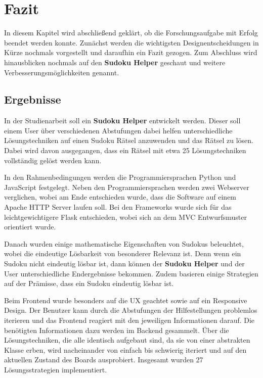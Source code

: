 
\chapter{Fazit}

In diesem Kapitel wird abschließend geklärt, ob die Forschungsaufgabe mit Erfolg beendet werden konnte. Zunächst werden die wichtigsten Designentscheidungen in Kürze nochmals vorgestellt und daraufhin ein Fazit gezogen. Zum Abschluss wird hinausblicken nochmals auf den \textbf{Sudoku Helper} geschaut und weitere Verbesserungsmöglichkeiten genannt. 

\section{Ergebnisse}

In der Studienarbeit soll ein \textbf{Sudoku Helper} entwickelt werden. Dieser soll einem User über verschiedenen Abstufungen dabei helfen unterschiedliche Lösungstechniken auf einen Sudoku Rätsel anzuwenden und das Rätsel zu lösen. Dabei wird davon ausgegangen, dass ein Rätsel mit etwa 25 Lösungstechniken vollständig gelöst werden kann. 

In den Rahmenbedingungen werden die Programmiersprachen Python und JavaScript festgelegt. Neben den Programmiersprachen werden zwei Webserver verglichen, wobei am Ende entschieden wurde, dass die Software auf einem Apache \ac{HTTP} Server laufen soll. Bei den Frameworks wurde sich für das leichtgewichtigere Flask entschieden, wobei sich an dem \ac{MVC} Entwurfsmuster orientiert wurde.

Danach wurden einige mathematische Eigenschaften von Sudokus beleuchtet, wobei die eindeutige Lösbarkeit von besonderer Relevanz ist. Denn wenn ein Sudoku nicht eindeutig lösbar ist, dann können der \textbf{Sudoku Helper} und der User unterschiedliche Endergebnisse bekommen. Zudem basieren einige Strategien auf der Prämisse, dass ein Sudoku eindeutig lösbar ist.

Beim Frontend wurde besonders auf die \ac{UX} geachtet sowie auf ein Responsive Design. Der Benutzer kann durch die Abstufungen der Hilfestellungen problemlos iterieren und das Frontend reagiert mit den jeweiligen Informationen darauf. Die benötigten Informationen dazu werden im Backend gesammelt. Über die Lösungstechniken, die alle identisch aufgebaut sind, da sie von einer abstrakten Klasse erben, wird nacheinander von einfach bis schwierig iteriert und auf den aktuellen Zustand des Boards ausprobiert. Insgesamt wurden 27 Lösungsstrategien implementiert.


